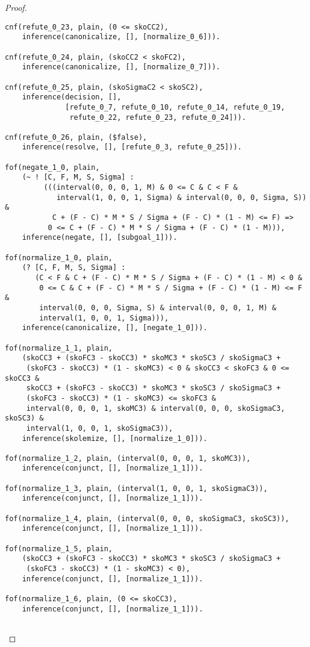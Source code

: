 \begin{proof}
\begin{verbatim}
cnf(refute_0_23, plain, (0 <= skoCC2),
    inference(canonicalize, [], [normalize_0_6])).

cnf(refute_0_24, plain, (skoCC2 < skoFC2),
    inference(canonicalize, [], [normalize_0_7])).

cnf(refute_0_25, plain, (skoSigmaC2 < skoSC2),
    inference(decision, [],
              [refute_0_7, refute_0_10, refute_0_14, refute_0_19,
               refute_0_22, refute_0_23, refute_0_24])).

cnf(refute_0_26, plain, ($false),
    inference(resolve, [], [refute_0_3, refute_0_25])).

fof(negate_1_0, plain,
    (~ ! [C, F, M, S, Sigma] :
         (((interval(0, 0, 0, 1, M) & 0 <= C & C < F &
            interval(1, 0, 0, 1, Sigma) & interval(0, 0, 0, Sigma, S)) &
           C + (F - C) * M * S / Sigma + (F - C) * (1 - M) <= F) =>
          0 <= C + (F - C) * M * S / Sigma + (F - C) * (1 - M))),
    inference(negate, [], [subgoal_1])).

fof(normalize_1_0, plain,
    (? [C, F, M, S, Sigma] :
       (C < F & C + (F - C) * M * S / Sigma + (F - C) * (1 - M) < 0 &
        0 <= C & C + (F - C) * M * S / Sigma + (F - C) * (1 - M) <= F &
        interval(0, 0, 0, Sigma, S) & interval(0, 0, 0, 1, M) &
        interval(1, 0, 0, 1, Sigma))),
    inference(canonicalize, [], [negate_1_0])).

fof(normalize_1_1, plain,
    (skoCC3 + (skoFC3 - skoCC3) * skoMC3 * skoSC3 / skoSigmaC3 +
     (skoFC3 - skoCC3) * (1 - skoMC3) < 0 & skoCC3 < skoFC3 & 0 <= skoCC3 &
     skoCC3 + (skoFC3 - skoCC3) * skoMC3 * skoSC3 / skoSigmaC3 +
     (skoFC3 - skoCC3) * (1 - skoMC3) <= skoFC3 &
     interval(0, 0, 0, 1, skoMC3) & interval(0, 0, 0, skoSigmaC3, skoSC3) &
     interval(1, 0, 0, 1, skoSigmaC3)),
    inference(skolemize, [], [normalize_1_0])).

fof(normalize_1_2, plain, (interval(0, 0, 0, 1, skoMC3)),
    inference(conjunct, [], [normalize_1_1])).

fof(normalize_1_3, plain, (interval(1, 0, 0, 1, skoSigmaC3)),
    inference(conjunct, [], [normalize_1_1])).

fof(normalize_1_4, plain, (interval(0, 0, 0, skoSigmaC3, skoSC3)),
    inference(conjunct, [], [normalize_1_1])).

fof(normalize_1_5, plain,
    (skoCC3 + (skoFC3 - skoCC3) * skoMC3 * skoSC3 / skoSigmaC3 +
     (skoFC3 - skoCC3) * (1 - skoMC3) < 0),
    inference(conjunct, [], [normalize_1_1])).

fof(normalize_1_6, plain, (0 <= skoCC3),
    inference(conjunct, [], [normalize_1_1])).


\end{verbatim}
\end{proof}
